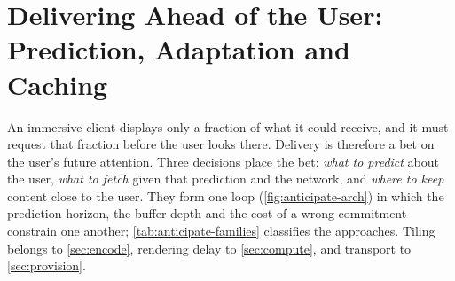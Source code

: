\section{Delivering Ahead of the User: Prediction, Adaptation and Caching}\label{sec:anticipate}

An immersive client displays only a fraction of what it could receive, and it must request that fraction before the user looks there. Delivery is therefore a bet on the user's future attention. Three decisions place the bet: \emph{what to predict} about the user, \emph{what to fetch} given that prediction and the network, and \emph{where to keep} content close to the user. They form one loop (\cref{fig:anticipate-arch}) in which the prediction horizon, the buffer depth and the cost of a wrong commitment constrain one another; \cref{tab:anticipate-families} classifies the approaches. Tiling belongs to \cref{sec:encode}, rendering delay to \cref{sec:compute}, and transport to \cref{sec:provision}.

